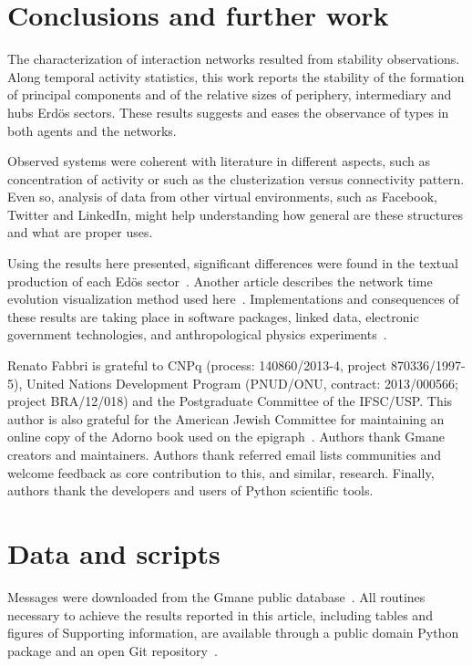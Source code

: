 \documentclass[%
 aip,
 jmp,%
 amsmath,amssymb,
 reprint,%
]{revtex4-1}
\begin{document}
\section{Conclusions and further work}\label{sec:conc}
The characterization of interaction networks resulted from stability observations. 
Along temporal activity statistics, this work reports the stability of the formation of principal components and of the relative sizes of periphery, intermediary and hubs Erd\"os sectors.
These results suggests and eases the observance of types in both agents and the networks.

Observed systems were coherent with literature in different aspects, such as concentration of activity or such as the clusterization versus connectivity pattern.
Even so, analysis of data from other virtual environments, such as Facebook, Twitter and LinkedIn, might help understanding how general are these structures and what are proper uses.

Using the results here presented, significant differences were found in the textual production of each Ed\"os sector~\cite{rcText}.
Another article describes the network time evolution visualization method used here~\cite{versinus}.
Implementations and consequences of these results are taking place in software packages, linked data, 
electronic government technologies, and anthropological physics experiments~\cite{gmanePack,ops,opa,ensaio,anPhy}.

\begin{acknowledgments}
Renato Fabbri is grateful to CNPq (process: 140860/2013-4,
project 870336/1997-5), United Nations Development Program (PNUD/ONU, contract: 2013/000566; project BRA/12/018)  and 
the Postgraduate Committee of the IFSC/USP. This author is also grateful for
the American Jewish Committee for maintaining an online copy of the Adorno book
used on the epigraph~\cite{adorno}. Authors thank Gmane creators and maintainers. Authors thank referred email lists communities and welcome feedback as core contribution to this, and similar, research. Finally, authors thank the developers and users of Python scientific tools.
\end{acknowledgments}


\appendix
\section{Data and scripts}\label{scripts}
Messages were downloaded from the Gmane public database~\cite{GMANEwikipedia}.
All routines necessary to achieve the results reported in this article, including tables and figures of Supporting information, are available through a public domain Python package and an open Git repository~\cite{gmanePack}.

\end{document}
